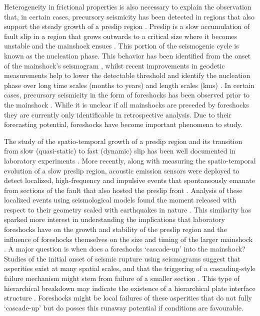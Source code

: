 \documentclass[preprint,1p, 10pt,authoryear]{elsarticle}
\begin{document}
Heterogeneity in frictional properties is also necessary to explain the observation that, in certain cases, precursory seismicity has been detected in regions that also support the steady growth of a preslip region \citep{Kato2012, Kato2016, Obara2016, Ruiz2014, Bouchon2013,Buergmann2004}. Preslip is a slow accumulation of fault slip in a region that grows outwards to a critical size where it becomes unstable and the mainshock ensues \citep{Ohnaka1992,Ben-Zion2008}. This portion of the seismogenic cycle is known as the nucleation phase. This behavior has been identified from the onset of the mainshock's seismogram \citep{Iio1995, Ellsworth1995, Beroza1996}, whilst recent improvements in geodetic measurements help to lower the detectable threshold and identify the nucleation phase over long time scales (months to years) and length scales (kms) \citep[e.g.,][]{Roeloffs2006,Ruiz2014, Socquet2017}.  In certain cases, precursory seismicity in the form of foreshocks has been observed prior to the mainshock \citep[e.g.,][]{Dodge1995, Dodge1996, Bouchon2011}. While it is unclear if all mainshocks are preceded by foreshocks \citep{Brodsky2014, Mignan2014, Seif2018} they are currently only identificable in retrospective analysis. Due to their forecasting potential, foreshocks have become important phenomena to study.

The study of the spatio-temporal growth of a preslip region  and its transition from slow (quasi-static) to fast (dynamic) slip has been well documented in laboratory experiments \citep{Dieterich1978,Okubo1984, Ohnaka1999, Nielsen2010, Latour2013, Fukuyama2018, Zhuo2018, Ke2018, Buijze2020}. More recently, along with measuring the spatio-temporal evolution of a slow preslip region, acoustic emission sensors were deployed to detect localized, high-frequency and impulsive events that spontaneously emanate from sections of the fault that also hosted the preslip front \citep{Ma2002, McLaskey2013, Selvadurai2015,Passelegue2017, Zhuo2018a}.  Analysis of these localized events using seismological models found the moment released with respect to their geometry scaled with earthquakes in nature \citep{McLaskey2014, Selvadurai2019}. This similarity has sparked more interest in understanding the implications that laboratory foreshocks have on the growth and stability of the preslip region and the influence of foreshocks themselves on the size and timing of the larger mainshock \citep{McLaskey2019}.  A major question is when does a foreshocks `cascade-up' into the mainshock? Studies of the initial onset of seismic rupture using seismograms suggest that asperities exist at many spatial scales, and that the triggering of a cascading-style failure mechanism might stem from failure of a smaller section \citep{Okuda2018, Ide2019}. This type of hierarchical breakdown may indicate the existence of a hierarchical plate interface structure \citep{Ide2005, Aochi2014, Aochi2017}.  Foreshocks might be local failures of these asperities that do not fully `cascade-up' but do posses this runaway potential if conditions are favourable. 
\end{document}
